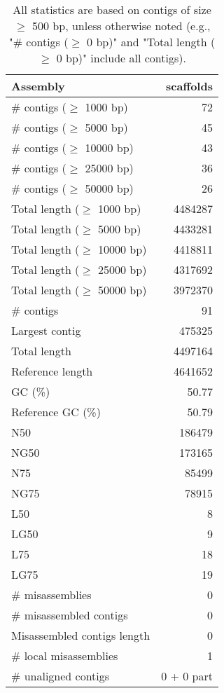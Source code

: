 \documentclass[12pt,a4paper]{article}
\begin{document}
\begin{table}[ht]
\begin{center}
\caption{All statistics are based on contigs of size $\geq$ 500 bp, unless otherwise noted (e.g., "\# contigs ($\geq$ 0 bp)" and "Total length ($\geq$ 0 bp)" include all contigs).}
\begin{tabular}{|l*{1}{|r}|}
\hline
Assembly & scaffolds \\ \hline
\# contigs ($\geq$ 1000 bp) & 72 \\ \hline
\# contigs ($\geq$ 5000 bp) & 45 \\ \hline
\# contigs ($\geq$ 10000 bp) & 43 \\ \hline
\# contigs ($\geq$ 25000 bp) & 36 \\ \hline
\# contigs ($\geq$ 50000 bp) & 26 \\ \hline
Total length ($\geq$ 1000 bp) & 4484287 \\ \hline
Total length ($\geq$ 5000 bp) & 4433281 \\ \hline
Total length ($\geq$ 10000 bp) & 4418811 \\ \hline
Total length ($\geq$ 25000 bp) & 4317692 \\ \hline
Total length ($\geq$ 50000 bp) & 3972370 \\ \hline
\# contigs & 91 \\ \hline
Largest contig & 475325 \\ \hline
Total length & 4497164 \\ \hline
Reference length & 4641652 \\ \hline
GC (\%) & 50.77 \\ \hline
Reference GC (\%) & 50.79 \\ \hline
N50 & 186479 \\ \hline
NG50 & 173165 \\ \hline
N75 & 85499 \\ \hline
NG75 & 78915 \\ \hline
L50 & 8 \\ \hline
LG50 & 9 \\ \hline
L75 & 18 \\ \hline
LG75 & 19 \\ \hline
\# misassemblies & 0 \\ \hline
\# misassembled contigs & 0 \\ \hline
Misassembled contigs length & 0 \\ \hline
\# local misassemblies & 1 \\ \hline
\# unaligned contigs & 0 + 0 part \\ \hline

\end{tabular}
\end{center}
\end{table}
\end{document}
